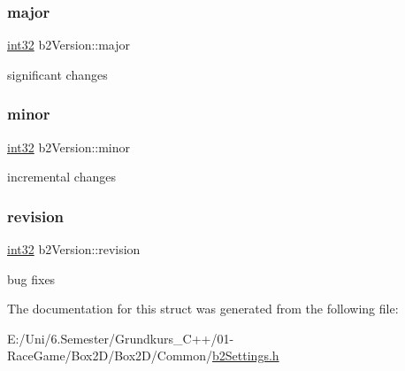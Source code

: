 \subsubsection{\texorpdfstring{major}{major}}
{\footnotesize\ttfamily \mbox{\hyperlink{b2_settings_8h_a43d43196463bde49cb067f5c20ab8481}{int32}} b2\+Version\+::major}



significant changes 

\mbox{\label{structb2_version_a115b8797a6e0b8e53f54502bd20d89da}} 
\subsubsection{\texorpdfstring{minor}{minor}}
{\footnotesize\ttfamily \mbox{\hyperlink{b2_settings_8h_a43d43196463bde49cb067f5c20ab8481}{int32}} b2\+Version\+::minor}



incremental changes 

\mbox{\label{structb2_version_a395cfe1434e348115d2ead3d72b88847}} 
\subsubsection{\texorpdfstring{revision}{revision}}
{\footnotesize\ttfamily \mbox{\hyperlink{b2_settings_8h_a43d43196463bde49cb067f5c20ab8481}{int32}} b2\+Version\+::revision}



bug fixes 



The documentation for this struct was generated from the following file\+:\begin{DoxyCompactItemize}
\item 
E\+:/\+Uni/6.\+Semester/\+Grundkurs\+\_\+\+C++/01-\/\+Race\+Game/\+Box2\+D/\+Box2\+D/\+Common/\mbox{\hyperlink{b2_settings_8h}{b2\+Settings.\+h}}\end{DoxyCompactItemize}
